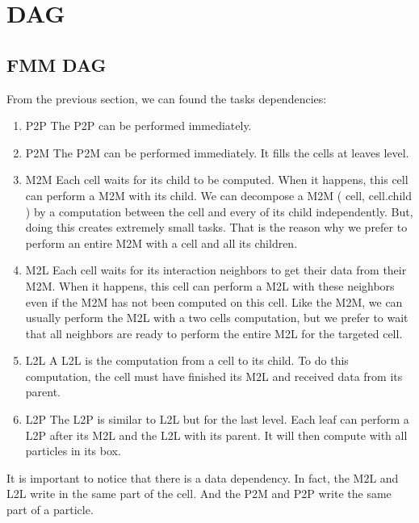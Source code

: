 \documentclass[12pt,letterpaper,titlepage]{report}
\begin{document}
\chapter{DAG}
\section{FMM DAG}
From the previous section, we can found the tasks dependencies:
\begin{enumerate}
\item P2P \linebreak
The P2P can be performed immediately.
\item P2M \linebreak
The P2M can be performed immediately.
It fills the cells at leaves level.
\item M2M \linebreak
Each cell waits for its child to be computed.
When it happens, this cell can perform a M2M with its child.
We can decompose a M2M ( cell, cell.child ) by a computation between the cell and every of its child independently.
But, doing this creates extremely small tasks.
That is the reason why we prefer to perform an entire M2M with a cell and all its children.
\item M2L \linebreak
Each cell waits for its interaction neighbors to get their data from their M2M.
When it happens, this cell can perform a M2L with these neighbors even if the M2M has not been computed on this cell.
Like the M2M, we can usually perform the M2L with a two cells computation, but we prefer to wait that all neighbors are ready to perform the entire M2L for the targeted cell.
\item L2L \linebreak
A L2L is the computation from a cell to its child.
To do this computation, the cell must have finished its M2L and received data from its parent.
\item L2P \linebreak
The L2P is similar to L2L but for the last level.
Each leaf can perform a L2P after its M2L and the L2L with its parent.
It will then compute with all particles in its box.
\end{enumerate}
\BlankLine
It is important to notice that there is a data dependency.
In fact, the M2L and L2L write in the same part of the cell.
And the P2M and P2P write the same part of a particle.
\end{document}
